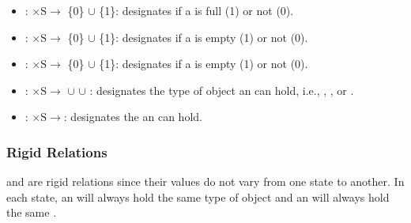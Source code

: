 \begin{itemize}
\item {}: $\mathrm{\times S\rightarrow}$ \{0\} $\cup$ \{1\}: designates if a  is full (1) or not (0).

\item {}: $\mathrm{\times S\rightarrow}$ \{0\} $\cup$ \{1\}: designates if a  is empty (1) or not (0).

\item {}: $\mathrm{\times S\rightarrow}$ \{0\} $\cup$ \{1\}: designates if a  is empty (1) or not (0).

\item {}: $\mathrm{\times S \rightarrow}$ $\cup$  $\cup$ : designates the type of object an  can hold, i.e., , , or .

\item {}: $\mathrm{\times S \rightarrow}$: designates the  an  can hold.
\end{itemize}


\subsubsection{Rigid Relations}
\label{subsubsect:Rigid_Relation}
 and  are rigid relations since their values do not vary from one state to another. In each state, an  will always hold the same type of object and an  will always hold the same .


